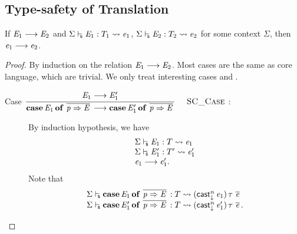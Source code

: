 \subsection{Type-safety of Translation}
\begin{lem}\label{lem:appendix:src:redtr}
If $\mathit{E_{{\mathrm{1}}}}  \longrightarrow  \mathit{E_{{\mathrm{2}}}}$ and $ \Sigma  \vdash_{\!\!\mathsf{s} }  \mathit{E_{{\mathrm{1}}}}  :  T_{{\mathrm{1}}}   \rightsquigarrow   \mathit{e_{{\mathrm{1}}}} $, $ \Sigma  \vdash_{\!\!\mathsf{s} }  \mathit{E_{{\mathrm{2}}}}  :  T_{{\mathrm{2}}}   \rightsquigarrow   \mathit{e_{{\mathrm{2}}}} $ for
some context $\Sigma$, then $\mathit{e_{{\mathrm{1}}}}  \longrightarrow  \mathit{e_{{\mathrm{2}}}}$.
\end{lem}

\begin{proof}
    By induction on the relation $\mathit{E_{{\mathrm{1}}}}  \longrightarrow  \mathit{E_{{\mathrm{2}}}}$. Most cases are the same as
core language, which are trivial. We only treat interesting cases
 and .
    \begin{description}
        \item[Case \scriptsize{${\displaystyle\frac{\begin{array}{l} {\mathit{E_{{\mathrm{1}}}} \longrightarrow \mathit{E'_{{\mathrm{1}}}}} \end{array}}{ \mathbf{case} \, \mathit{E_{{\mathrm{1}}}} \, \mathbf{of} \, \,\overline{ \mathit{p} \Rightarrow \mathit{E} }\, \longrightarrow \mathbf{case} \, \mathit{E'_{{\mathrm{1}}}} \, \mathbf{of} \, \,\overline{ \mathit{p} \Rightarrow \mathit{E} }\,}\quad\textsc{ {\textsc{SC\_Case}}{} }}$}:] $\quad$ \\
        By induction hypothesis, we have 
        \[\begin{array}{l}
         \Sigma  \vdash_{\!\!\mathsf{s} }  \mathit{E_{{\mathrm{1}}}}  :  T   \rightsquigarrow   \mathit{e_{{\mathrm{1}}}}  \\ 
         \Sigma  \vdash_{\!\!\mathsf{s} }  \mathit{E'_{{\mathrm{1}}}}  :  T'   \rightsquigarrow   \mathit{e'_{{\mathrm{1}}}}  \\ 
        \mathit{e_{{\mathrm{1}}}}  \longrightarrow  \mathit{e'_{{\mathrm{1}}}}.
        \end{array} \]
        Note that 
        \[\begin{array}{l}
             \Sigma  \vdash_{\!\!\mathsf{s} }  \mathbf{case} \, \mathit{E_{{\mathrm{1}}}} \, \mathbf{of} \, \,\overline{  \mathit{p}  \Rightarrow  \mathit{E}  }\,  :  T   \rightsquigarrow   (  \mathsf{cast}_{\downarrow}^n \, \mathit{e_{{\mathrm{1}}}}  ) \, \tau \, \,\overline{  \mathit{e}  }\,  \\ 
             \Sigma  \vdash_{\!\!\mathsf{s} }  \mathbf{case} \, \mathit{E'_{{\mathrm{1}}}} \, \mathbf{of} \, \,\overline{  \mathit{p}  \Rightarrow  \mathit{E}  }\,  :  T   \rightsquigarrow   (  \mathsf{cast}_{\downarrow}^n \, \mathit{e'_{{\mathrm{1}}}}  ) \, \tau \, \,\overline{  \mathit{e}  }\, . 

\end{array}\]
\end{description}
\end{proof}
